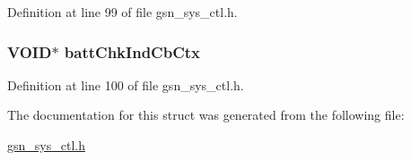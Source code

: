 Definition at line 99 of file gsn\_\-sys\_\-ctl.h.

\hypertarget{a00254_a0f343e3461047aff3e42c39c2370b116}{
\subsubsection[{battChkIndCbCtx}]{\setlength{\rightskip}{0pt plus 5cm}VOID$\ast$ {\bf battChkIndCbCtx}}}
\label{a00254_a0f343e3461047aff3e42c39c2370b116}


Definition at line 100 of file gsn\_\-sys\_\-ctl.h.



The documentation for this struct was generated from the following file:\begin{DoxyCompactItemize}
\item 
\hyperlink{a00592}{gsn\_\-sys\_\-ctl.h}\end{DoxyCompactItemize}
